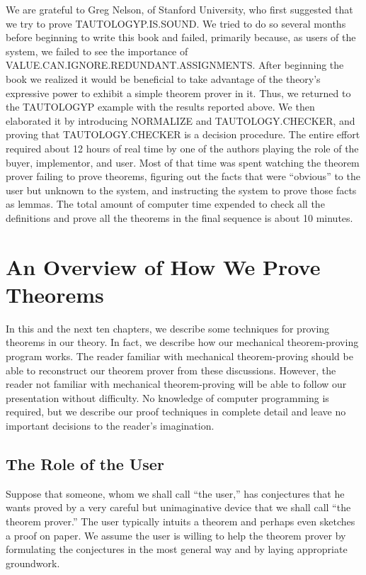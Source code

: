 \documentclass[11pt]{book}
\newcommand{\pubdefaulttextsize}{\large}
\begin{document}
We are grateful to Greg Nelson, of Stanford University, who first
suggested that we try to prove  TAU\-TOL\-OGYP.IS.SOUND.  We tried to do so
several months before beginning to write this book and failed, primarily
because, as users of the system, we failed to see the importance of
VALUE.CAN.IG\-NORE.RE\-DUN\-DANT.ASSIGN\-MENTS.  After beginning the book we
realized it would be beneficial to take advantage of the
theory's expressive power to exhibit a simple theorem prover in it.
Thus, we returned to the TAUTOLOGYP example with the results reported above.
We then elaborated it by introducing NOR\-MAL\-IZE and TAU\-TOL\-OGY.CHECK\-ER,
and proving that TAU\-TOL\-OGY.CHECK\-ER is a decision procedure.
The entire effort required
about 12 hours of real time by one of the authors playing the role of
the buyer, implementor, and user.  Most of that time was spent
watching the theorem prover failing to prove theorems, figuring out the facts
that were ``obvious'' to the user but unknown to the system, and instructing
the system to prove those facts as lemmas.
The total amount of computer
time expended to check all the   definitions and prove all the theorems
in the final sequence
is about 10 minutes.
\chapter{An Overview of How We Prove Theorems}
\label{SECPROVE}
\pubdefaulttextsize
In this and the next ten chapters, we describe some techniques
for proving theorems in our theory.  In fact, we describe how
our mechanical theorem-proving program works.  The reader familiar with mechanical
theorem-proving should be able to reconstruct our theorem prover from these
discussions.  However, the reader
not familiar with mechanical theorem-proving will be able to follow our
presentation without difficulty.
No knowledge of computer programming is required, but we describe
our proof techniques in complete detail and leave no important
decisions to the reader's imagination.
\section{The Role of the User}
\pubdefaulttextsize
Suppose that someone, whom we shall call ``the user,'' has
conjectures that he wants  proved by a very
careful but unimaginative device that we shall call ``the
theorem prover.''
The user typically intuits a theorem and perhaps
even sketches a proof on paper.
We assume the user is willing to help
the theorem prover by formulating the conjectures in the most general
way and by laying appropriate groundwork.
\end{document}
